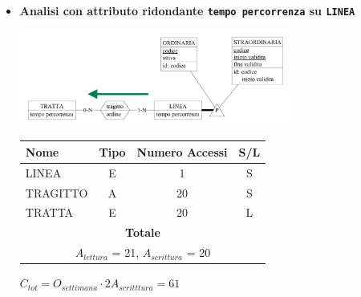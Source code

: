 \documentclass[12pt,a4paper]{report}
\begin{document}
\begin{enumerate}[label=\textbf{\arabic*}]
	 \begin{itemize}
    	\item \textbf{Analisi con attributo ridondante \texttt{tempo percorrenza} su \texttt{LINEA}}
	\begin{center}
	\includegraphics[width=0.7\textwidth]{InserimentoLineaRid}
	\end{center}
	\begin{table}[H]
	\centering
	\begin{tabular}{|l|c|c|c|}
	\hline
	Nome & Tipo & Numero Accessi & S/L \\
	\hline
	LINEA & E & 1 & S \\
	\hline
	TRAGITTO & A & 20 & S \\
	\hline
	TRATTA & E & 20 & L \\
	\hline
	    \multicolumn{4}{c}{\textbf{Totale}} \\
	    \multicolumn{4}{c}{${A_{lettura}}$ = 21, ${A_{scrittura}}$ = 20} \\
	    \hline
	    \end{tabular}
	    \end{table}
	    \begin{center}
	    ${C_{tot} = {O_{settimana}}\cdot{2A_{scritttura}}= 61}$
	    \end{center}


\end{itemize}
\end{enumerate}
\end{document}
